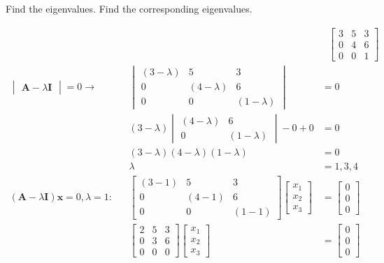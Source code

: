 \documentclass{article}
\begin{document}
Find the eigenvalues.  Find the corresponding eigenvalues.

\begin{align}
    \label{eq:1}
    && &\text{ } \begin{bmatrix}
    3&5&3\\
    0&4&6\\
    0&0&1
    \end{bmatrix}
    \\
    \label{eq:2}
    \begin{vmatrix} \textbf{A}-\lambda\textbf{I}\end{vmatrix} = 0 \rightarrow && \begin{vmatrix}
    (3-\lambda) & 5 & 3\\
    0 & (4-\lambda) & 6\\
    0 & 0 & (1-\lambda)
    \end{vmatrix} &=0
    \\
    \label{eq:3}
    && (3-\lambda)\begin{vmatrix}
    (4-\lambda) & 6\\
    0 & (1-\lambda)
    \end{vmatrix} -0 + 0 &= 0
    \\
    \label{eq:4}
    && (3-\lambda)(4-\lambda)(1-\lambda) &= 0
    \\
    \label{eq:5}
    && \lambda &= 1, 3, 4
    \\
    \label{eq:6}
    (\textbf{A}-\lambda\textbf{I})\textbf{x} = 0, \lambda=1: && \begin{bmatrix} 
    (3-1) & 5 & 3\\
    0 & (4-1) & 6\\
    0 & 0 & (1-1) \end{bmatrix} \begin{bmatrix}x_1\\x_2\\x_3\end{bmatrix} &= \begin{bmatrix} 0\\0\\0\end{bmatrix}
    \\
    \label{eq:7}
    && \begin{bmatrix} 
    2&5&3\\
    0&3&6\\
    0&0&0\end{bmatrix} \begin{bmatrix} x_1\\x_2\\x_3 \end{bmatrix} &= \begin{bmatrix}0\\0\\0\end{bmatrix}

\end{align}
\end{document}

